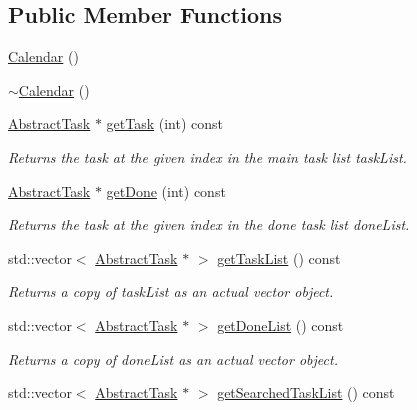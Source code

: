 \subsection*{Public Member Functions}
\begin{DoxyCompactItemize}
\item 
\hyperlink{class_do_lah_1_1_calendar_afde5e203ea4cb45ecf4d2cabce19826e}{Calendar} ()
\item 
\hyperlink{class_do_lah_1_1_calendar_abe8ecd064fff0cb055938c2f2ab6eaca}{$\sim$\+Calendar} ()
\item 
\hyperlink{class_do_lah_1_1_abstract_task}{Abstract\+Task} $\ast$ \hyperlink{class_do_lah_1_1_calendar_abb1d17aa8c99cc151a43d8f13ebff86b}{get\+Task} (int) const 
\begin{DoxyCompactList}\small\item\em Returns the task at the given index in the main task list task\+List. \end{DoxyCompactList}\item 
\hyperlink{class_do_lah_1_1_abstract_task}{Abstract\+Task} $\ast$ \hyperlink{class_do_lah_1_1_calendar_ac6461f76975d358bd5f109d3e5c129a6}{get\+Done} (int) const 
\begin{DoxyCompactList}\small\item\em Returns the task at the given index in the done task list done\+List. \end{DoxyCompactList}\item 
std\+::vector$<$ \hyperlink{class_do_lah_1_1_abstract_task}{Abstract\+Task} $\ast$ $>$ \hyperlink{class_do_lah_1_1_calendar_a3cbae80d27c584a64026725f64d07896}{get\+Task\+List} () const 
\begin{DoxyCompactList}\small\item\em Returns a copy of task\+List as an actual vector object. \end{DoxyCompactList}\item 
std\+::vector$<$ \hyperlink{class_do_lah_1_1_abstract_task}{Abstract\+Task} $\ast$ $>$ \hyperlink{class_do_lah_1_1_calendar_ac14944af156416344c85d0c4001281b0}{get\+Done\+List} () const 
\begin{DoxyCompactList}\small\item\em Returns a copy of done\+List as an actual vector object. \end{DoxyCompactList}\item 
std\+::vector$<$ \hyperlink{class_do_lah_1_1_abstract_task}{Abstract\+Task} $\ast$ $>$ \hyperlink{class_do_lah_1_1_calendar_aaf633ddb1652ac6faa1e6e3a0a2aaea9}{get\+Searched\+Task\+List} () const 

\end{DoxyCompactItemize}
